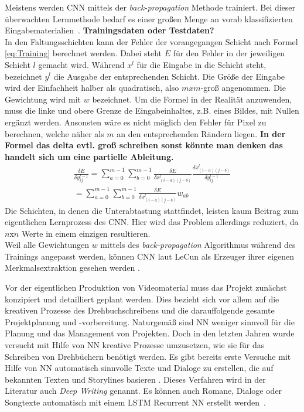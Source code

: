 \documentclass[times, 11pt,twocolumn]{article}
\begin{document}
 \label{sec:Training}
Meistens werden CNN mittels der \textit{back-propagation} Methode trainiert. Bei dieser überwachten Lernmethode bedarf es einer großen Menge an vorab klassifizierten Eingabematerialien~\cite{5537907}. \textbf{Trainingsdaten oder Testdaten?} \\
In den Faltungsschichten kann der Fehler der vorangegangen Schicht nach Formel \ref{eq:Training} berechnet werden. Dabei steht $E$ für den Fehler in der jeweiligen Schicht $l$ gemacht wird. Während $x^l$ für die Eingabe in die Schicht steht, bezeichnet $y^l$ die Ausgabe der entsprechenden Schicht. Die Größe der Eingabe wird der Einfachheit halber als quadratisch, also $mxm$-groß angenommen. Die Gewichtung wird mit $w$ bezeichnet. Um die Formel in der Realität anzuwenden, muss die linke und obere Grenze de Eingabeinhaltes, z.B. eines Bildes, mit Nullen ergänzt werden. Ansonsten wäre es nicht möglich den Fehler für Pixel zu berechnen, welche näher als $m$ an den entsprechenden Rändern liegen. \textbf{In der Formel das delta evtl. groß schreiben sonst könnte man denken das handelt sich um eine partielle Ableitung.}\\
\footnotesize
\begin{equation}
\begin{aligned}
\frac{\delta E}{\delta y_{ij}^{l-1}} = \sum_{a=0}^{m-1} \sum_{b=0}^{m-1} \frac{\delta E}{\delta x_{(i-a)(j-b)}^{l}} \frac{\delta x_{(i-a)(j-b)}^{l}}{\delta y_{ij}^{l-1}}  \\
= \sum \limits_{a=0}^{m-1} \sum \limits_{b=0}^{m-1} \frac{\delta E}{\delta x_{(i-a)(j-b)}^{l}} w_{ab}
\end{aligned}
	\label{eq:Training}
\end{equation}
\small
Die Schichten, in denen die Unterabtastung stattfindet, leisten kaum Beitrag zum eigentlichen Lernprozess des CNN. Hier wird das Problem allerdings reduziert, da $n$x$n$ Werte in einem einzigen resultieren. \\
Weil alle Gewichtungen $w$ mittels des \textit{back-propagation} Algorithmus während des Trainings angepasst werden, können CNN laut LeCun als Erzeuger ihrer eigenen Merkmalsextraktion gesehen werden \cite{LeCun:1998:CNI:303568.303704}.


 \label{sec:Konzeption}
Vor der eigentlichen Produktion von Videomaterial muss das Projekt zunächst konzipiert und detailliert geplant werden. Dies bezieht sich vor allem auf die kreativen Prozesse des Drehbuchschreibens und die darauffolgende gesamte Projektplanung und -vorbereitung. Naturgemäß sind NN weniger sinnvoll für die Planung und das Management von Projekten. Doch in den letzten Jahren wurde versucht mit Hilfe von NN kreative Prozesse umzusetzen, wie sie für das Schreiben von Drehbüchern benötigt werden. Es gibt bereits erste Versuche mit Hilfe von NN automatisch sinnvolle Texte und Dialoge zu erstellen, die auf bekannten Texten und Storylines basieren \cite{Thoma16}. Dieses Verfahren wird in der Literatur auch \textit{Deep Writing} genannt. Es können auch Romane, Dialoge oder Songtexte automatisch mit einem LSTM Recurrent NN erstellt werden~\cite{DrehbuchWrite}.
\end{document}
